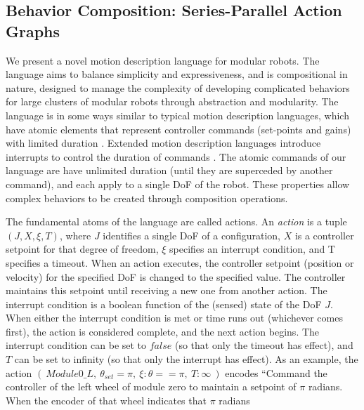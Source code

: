 \documentclass[conference]{IEEEtran}
\theoremstyle{definition}
\begin{document}
\subsection{Behavior Composition: Series-Parallel Action Graphs}
\label{sec:behavior-representation}
We present a novel motion description language for modular robots.  The
language aims to balance simplicity and expressiveness, and is compositional in
nature, designed to manage the complexity of developing complicated behaviors
for large clusters of modular robots through abstraction and modularity. 
The language is in some ways similar to typical motion description languages, which have atomic elements that represent controller
commands (set-points and gains) with limited duration \cite{brockett1988computer}.
Extended motion description languages introduce interrupts to control the duration
of commands \cite{hristu2003motion}.  The atomic commands of our language are have unlimited
duration (until they are superceded by another command), and each apply to a single
DoF of the robot.  These properties allow complex behaviors to be created through composition
operations.

 The fundamental atoms of the language are called actions.  An \textit{action} is a tuple \(
(J, X, \xi, T)\), where \(J\) identifies a single DoF of a configuration, \(X\) is a
controller setpoint for that degree of freedom, \(\xi\) specifies an interrupt
condition, and T specifies a timeout. When an action executes, the controller
setpoint (position or velocity) for the specified DoF is changed to the specified
value. The controller maintains this setpoint until receiving a new one from another
action. The interrupt condition is a boolean function of the (sensed) state of the DoF \(J\).
When either the interrupt condition is met or time runs out (whichever comes
first), the action is considered complete, and the next action  begins. The
interrupt condition can be set to \(false\) (so that only the timeout has effect),
and \(T\) can be set to infinity (so that only the interrupt has effect). As an example,
the action \((~Module0\_L,~ \theta_{set}=\pi,~ \xi:\theta==\pi,~T:\infty~)\) encodes
``Command the controller of the left wheel of module zero to maintain a setpoint
of \(\pi\) radians.  When the encoder of that wheel indicates that \(\pi\) radians
 
\end{document}
